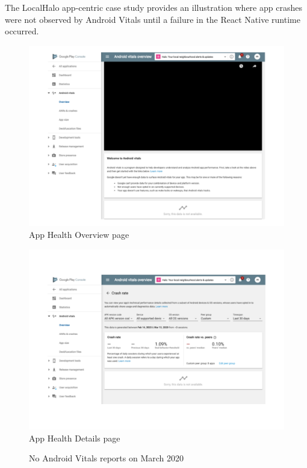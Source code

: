 The LocalHalo app-centric case study provides an illustration where app crashes were not observed by Android Vitals until a failure in the React Native runtime occurred.

\begin{figure}[htbp!]
\begin{minipage}{.49\linewidth}%
  \centering
  \includegraphics[width=\linewidth]{images/localhalo/apphealthoverviewplace_5550596_no_data.pdf}
  {\footnotesize App Health Overview page}
\end{minipage}\hfill%
\begin{minipage}{.49\linewidth}%
  \centering
  \includegraphics[width=\linewidth]{images/localhalo/apphealthdetailsplace_55505963_no_data.pdf}
  {\footnotesize App Health Details page}
\end{minipage}%
    \caption{No Android Vitals reports on  March 2020}
    \label{fig:localhalo-android-vitals-no-data-16-march-2020}
\end{figure}

